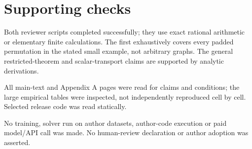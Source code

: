\documentclass[10pt]{article}
\begin{document}
\section*{Supporting checks}
Both reviewer scripts completed successfully; they use exact rational arithmetic or elementary finite calculations. The first exhaustively covers every padded permutation in the stated small example, not arbitrary graphs. The general restricted-theorem and scalar-transport claims are supported by analytic derivations.\par
All main-text and Appendix A pages were read for claims and conditions; the large empirical tables were inspected, not independently reproduced cell by cell. Selected release code was read statically.\par
No training, solver run on author datasets, author-code execution or paid model/API call was made. No human-review declaration or author adoption was asserted.\par
\end{document}

